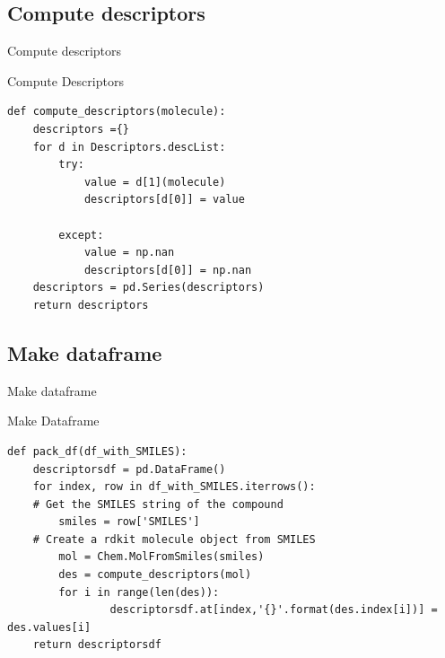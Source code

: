 \documentclass{beamer}
\begin{document}
\subsection{Compute descriptors}
\begin{frame}[fragile]{Compute descriptors}

\begin{block}{Compute Descriptors}
\begin{lstlisting}[firstnumber=1, label=glabels, xleftmargin=10pt] 
def compute_descriptors(molecule):
    descriptors ={}
    for d in Descriptors.descList:
        try:
            value = d[1](molecule)
            descriptors[d[0]] = value

        except:
            value = np.nan
            descriptors[d[0]] = np.nan
    descriptors = pd.Series(descriptors)
    return descriptors

\end{lstlisting}
\end{block}
    
\end{frame}
    

\subsection{Make dataframe}
\begin{frame}[fragile]{Make dataframe}

\begin{block}{Make Dataframe}
\begin{lstlisting}[firstnumber=1, label=glabels, xleftmargin=10pt] 
def pack_df(df_with_SMILES):
    descriptorsdf = pd.DataFrame()
    for index, row in df_with_SMILES.iterrows():
    # Get the SMILES string of the compound
        smiles = row['SMILES']
    # Create a rdkit molecule object from SMILES
        mol = Chem.MolFromSmiles(smiles)
        des = compute_descriptors(mol)
        for i in range(len(des)):
                descriptorsdf.at[index,'{}'.format(des.index[i])] = des.values[i]
    return descriptorsdf

\end{lstlisting}
\end{block}
    
\end{frame}
    
\end{document}
